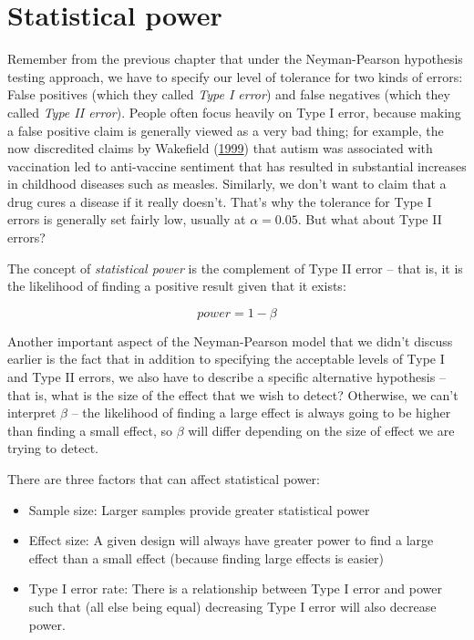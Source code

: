 \documentclass[12pt,]{book}
\providecommand{\tightlist}{%
  \setlength{\itemsep}{0pt}\setlength{\parskip}{0pt}}
\theoremstyle{definition}
\theoremstyle{definition}
\theoremstyle{definition}
\theoremstyle{remark}
\begin{document}
\hypertarget{statistical-power}{%
\section{Statistical power}\label{statistical-power}}

Remember from the previous chapter that under the Neyman-Pearson hypothesis testing approach, we have to specify our level of tolerance for two kinds of errors: False positives (which they called \emph{Type I error}) and false negatives (which they called \emph{Type II error}). People often focus heavily on Type I error, because making a false positive claim is generally viewed as a very bad thing; for example, the now discredited claims by Wakefield (\protect\hyperlink{ref-wake:1999}{1999}) that autism was associated with vaccination led to anti-vaccine sentiment that has resulted in substantial increases in childhood diseases such as measles. Similarly, we don't want to claim that a drug cures a disease if it really doesn't. That's why the tolerance for Type I errors is generally set fairly low, usually at \(\alpha = 0.05\). But what about Type II errors?

The concept of \emph{statistical power} is the complement of Type II error -- that is, it is the likelihood of finding a positive result given that it exists:

\[ 
power = 1 - \beta
\]

Another important aspect of the Neyman-Pearson model that we didn't discuss earlier is the fact that in addition to specifying the acceptable levels of Type I and Type II errors, we also have to describe a specific alternative hypothesis -- that is, what is the size of the effect that we wish to detect? Otherwise, we can't interpret \(\beta\) -- the likelihood of finding a large effect is always going to be higher than finding a small effect, so \(\beta\) will differ depending on the size of effect we are trying to detect.

There are three factors that can affect statistical power:

\begin{itemize}
\tightlist
\item
  Sample size: Larger samples provide greater statistical power
\item
  Effect size: A given design will always have greater power to find a large effect than a small effect (because finding large effects is easier)
\item
  Type I error rate: There is a relationship between Type I error and power such that (all else being equal) decreasing Type I error will also decrease power.
\end{itemize}
\end{document}
